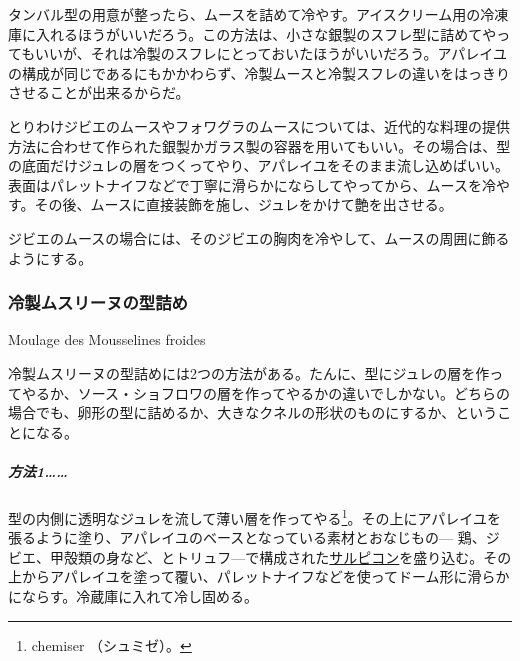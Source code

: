 \begin{recette}
タンバル型の用意が整ったら、ムースを詰めて冷やす。アイスクリーム用の冷凍庫に入れるほうがいいだろう。この方法は、小さな銀製のスフレ型に詰めてやってもいいが、それは冷製のスフレにとっておいたほうがいいだろう。アパレイユの構成が同じであるにもかかわらず、冷製ムースと冷製スフレの違いをはっきりさせることが出来るからだ。

とりわけジビエのムースやフォワグラのムースについては、近代的な料理の提供方法に合わせて作られた銀製かガラス製の容器を用いてもいい。その場合は、型の底面だけジュレの層をつくってやり、アパレイユをそのまま流し込めばいい。表面はパレットナイフなどで丁寧に滑らかにならしてやってから、ムースを冷やす。その後、ムースに直接装飾を施し、ジュレをかけて艶を出させる。

ジビエのムースの場合には、そのジビエの胸肉を冷やして、ムースの周囲に飾るようにする。

\atoaki{}

\hypertarget{moulage-des-mousselines-froides}{%
\subsubsection{冷製ムスリーヌの型詰め}\label{moulage-des-mousselines-froides}}

\begin{frsubenv}

Moulage des Mousselines froides

\end{frsubenv}



冷製ムスリーヌの型詰めには2つの方法がある。たんに、型にジュレの層を作ってやるか、ソース・ショフロワの層を作ってやるかの違いでしかない。どちらの場合でも、卵形の型に詰めるか、大きなクネルの形状のものにするか、ということになる。

\hypertarget{procede-un-moulage-des-mousselines-froides}{%
\subparagraph{方法1\ldots{}\ldots{}}\label{procede-un-moulage-des-mousselines-froides}}

型の内側に透明なジュレを流して薄い層を作ってやる\footnote{chemiser
  （シュミゼ）。}。その上にアパレイユを張るように塗り、アパレイユのベースとなっている素材とおなじもの---
鶏、ジビエ、甲殻類の身など、とトリュフ---で構成された\protect\hyperlink{salpicons-divers}{サルピコン}を盛り込む。その上からアパレイユを塗って覆い、パレットナイフなどを使ってドーム形に滑らかにならす。冷蔵庫に入れて冷し固める。


\end{recette}
